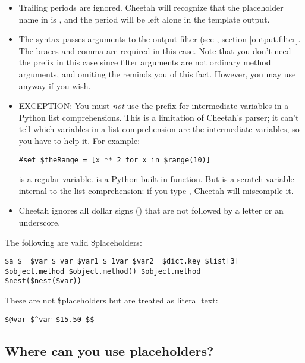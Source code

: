 \begin{itemize}
\item Trailing periods are ignored.  Cheetah will recognize that the placeholder
     name in  is , and the period will be left
     alone in the template output.
     
\item The syntax  passes arguments to
     the output filter (see , section \ref{output.filter}.
     The braces and comma are required in this case.  Note that you don't need
     the \code{\$} prefix in this case since filter arguments are not ordinary
     method arguments, and omiting the \code{\$} reminds you of this fact.
     However, you may use \code{\$} anyway if you wish.

\item EXCEPTION: You must {\em not} use the \code{\$} prefix for intermediate
     variables in a Python list comprehensions.  This is a limitation of
     Cheetah's parser; it can't tell which variables in a list comprehension
     are the intermediate variables, so you have to help it.  For example:
\begin{verbatim}
#set $theRange = [x ** 2 for x in $range(10)]
\end{verbatim}
      is a regular  variable.   is a
     Python built-in function.  But  is a scratch variable internal to
     the list comprehension: if you type , Cheetah will miscompile it.

\item Cheetah ignores all dollar signs (\code{\$}) that are not followed by a
     letter or an underscore.
     
\end{itemize} 

The following are valid \$placeholders:
\begin{verbatim}
$a $_ $var $_var $var1 $_1var $var2_ $dict.key $list[3]
$object.method $object.method() $object.method
$nest($nest($var))
\end{verbatim}

These are not \$placeholders but are treated as literal text:
\begin{verbatim}
$@var $^var $15.50 $$
\end{verbatim}


\subsection{Where can you use placeholders?}
\label{language.placeholders.positions}

